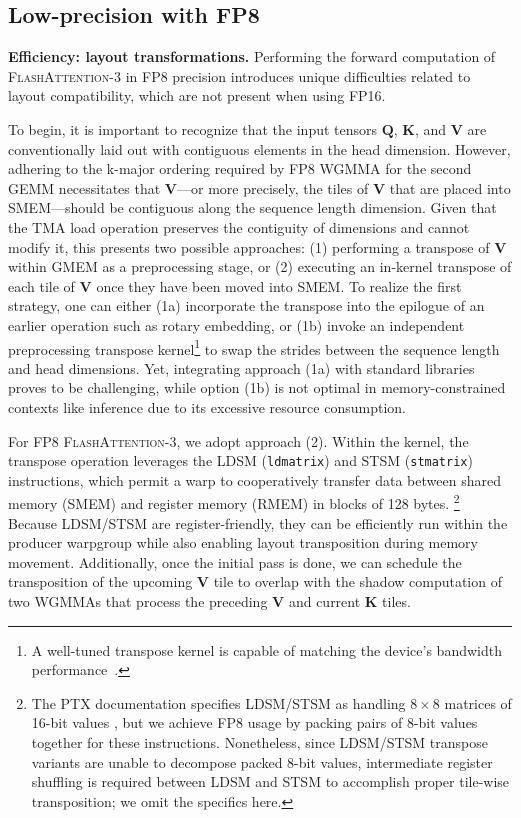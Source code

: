 \subsection{Low-precision with FP8}
\label{sec:algofp8}

\textbf{Efficiency: layout transformations.} Performing the forward computation of \textsc{FlashAttention-3} in FP8 precision introduces unique difficulties related to layout compatibility, which are not present when using FP16.

To begin, it is important to recognize that the input tensors $\mathbf{Q}$, $\mathbf{K}$, and $\mathbf{V}$ are conventionally laid out with contiguous elements in the head dimension. However, adhering to the k-major ordering required by FP8 WGMMA for the second GEMM necessitates that $\mathbf{V}$—or more precisely, the tiles of $\mathbf{V}$ that are placed into SMEM—should be contiguous along the sequence length dimension. Given that the TMA load operation preserves the contiguity of dimensions and cannot modify it, this presents two possible approaches: (1) performing a transpose of $\mathbf{V}$ within GMEM as a preprocessing stage, or (2) executing an in-kernel transpose of each tile of $\mathbf{V}$ once they have been moved into SMEM. To realize the first strategy, one can either (1a) incorporate the transpose into the epilogue of an earlier operation such as rotary embedding, or (1b) invoke an independent preprocessing transpose kernel\footnote{A well-tuned transpose kernel is capable of matching the device's bandwidth performance~\citep{colfax_cutlass_transpose_2024}.} to swap the strides between the sequence length and head dimensions. Yet, integrating approach (1a) with standard libraries proves to be challenging, while option (1b) is not optimal in memory-constrained contexts like inference due to its excessive resource consumption.

For FP8 \textsc{FlashAttention-3}, we adopt approach (2). Within the kernel, the transpose operation leverages the LDSM (\verb|ldmatrix|) and STSM (\verb|stmatrix|) instructions, which permit a warp to cooperatively transfer data between shared memory (SMEM) and register memory (RMEM) in blocks of 128 bytes. \footnote{The PTX documentation specifies LDSM/STSM as handling $8 \times 8$ matrices of 16-bit values \cite[\S 9.7.13.4.15-16]{ptx}, but we achieve FP8 usage by packing pairs of 8-bit values together for these instructions. Nonetheless, since LDSM/STSM transpose variants are unable to decompose packed 8-bit values, intermediate register shuffling is required between LDSM and STSM to accomplish proper tile-wise transposition; we omit the specifics here.} Because LDSM/STSM are register-friendly, they can be efficiently run within the producer warpgroup while also enabling layout transposition during memory movement. Additionally, once the initial pass is done, we can schedule the transposition of the upcoming $\mathbf{V}$ tile to overlap with the shadow computation of two WGMMAs that process the preceding $\mathbf{V}$ and current $\mathbf{K}$ tiles.

